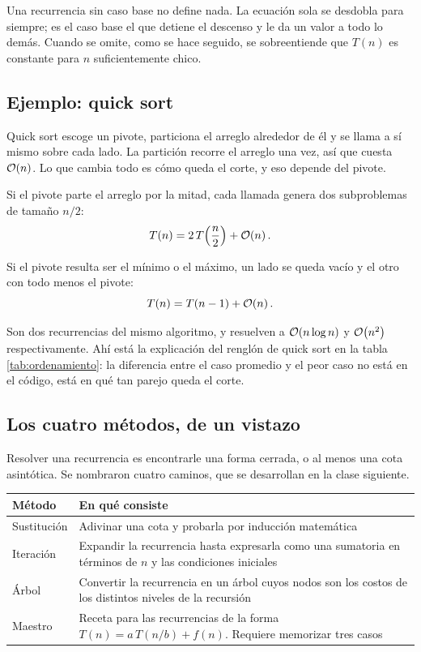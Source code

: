 \documentclass[11pt,letterpaper]{article}
\begin{document}
\begin{ojo}
  Una recurrencia sin caso base no define nada. La ecuación sola se
  desdobla para siempre; es el caso base el que detiene el descenso y
  le da un valor a todo lo demás. Cuando se omite, como se hace
  seguido, se sobreentiende que $T(n)$ es constante para $n$
  suficientemente chico.
\end{ojo}

\subsection*{Ejemplo: quick sort}

Quick sort escoge un pivote, particiona el arreglo alrededor de él y
se llama a sí mismo sobre cada lado. La partición recorre el arreglo
una vez, así que cuesta $\mathcal{O}\!\left(n\right)$. Lo que cambia todo es cómo queda
el corte, y eso depende del pivote.

Si el pivote parte el arreglo por la mitad, cada llamada genera dos
subproblemas de tamaño $n/2$:
\[
  T(n) = 2\,T\!\left(\frac{n}{2}\right) + \mathcal{O}\!\left(n\right) .
\]

Si el pivote resulta ser el mínimo o el máximo, un lado se queda
vacío y el otro con todo menos el pivote:
\[
  T(n) = T(n - 1) + \mathcal{O}\!\left(n\right) .
\]

\begin{idea}
  Son dos recurrencias del mismo algoritmo, y resuelven a
  $\mathcal{O}\!\left(n \log n\right)$ y $\mathcal{O}\!\left(n^2\right)$ respectivamente. Ahí está la
  explicación del renglón de quick sort en la tabla
  \ref{tab:ordenamiento}: la diferencia entre el caso promedio y el
  peor caso no está en el código, está en qué tan parejo queda el
  corte.
\end{idea}

\subsection*{Los cuatro métodos, de un vistazo}

Resolver una recurrencia es encontrarle una forma cerrada, o al menos
una cota asintótica. Se nombraron cuatro caminos, que se desarrollan
en la clase siguiente.

\begin{center}
\begin{tabular}{lp{8.3cm}}
  \toprule
  \textbf{Método} & \textbf{En qué consiste} \\
  \midrule
  Sustitución & Adivinar una cota y probarla por inducción
                matemática \\
  \addlinespace
  Iteración   & Expandir la recurrencia hasta expresarla como una
                sumatoria en términos de $n$ y las condiciones
                iniciales \\
  \addlinespace
  Árbol       & Convertir la recurrencia en un árbol cuyos nodos son
                los costos de los distintos niveles de la recursión \\
  \addlinespace
  Maestro     & Receta para las recurrencias de la forma
                $T(n) = a\,T(n/b) + f(n)$. Requiere memorizar tres
                casos \\
  \bottomrule
\end{tabular}
\end{center}
\end{document}
